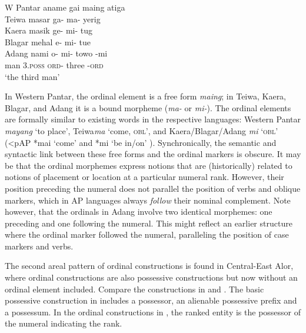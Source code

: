 \ea
\label{bkm:Ref342649632}
\gllllll
      {W Pantar}     aname  gai  maing  atiga \\  
      Teiwa          masar  ga-  ma-  yerig \\
      Kaera          masik  ge-  mi-  tug \\
      Blagar         mehal {\textglotstop}e-  mi-  tue  \\
      Adang          nami  o-  mi-  towo  {}-mi \\      
      { }            man \textsc{3.poss}  \textsc{ord-} three  -\textsc{ord} \\
\glt  `the third man'
\z

\let\eachwordone=\it
\let\eachwordtwo=\rm
\let\eachwordthree=\rm
\let\eachwordfour=\rm
\let\eachwordfive=\rm 

In Western Pantar, the ordinal element is a free form \textit{maing}; in Teiwa, Kaera, Blagar, and Adang it is a bound morpheme (\textit{ma-} or \textit{mi-}). The ordinal elements are formally similar to existing words in the respective languages: Western Pantar \textit{mayang} `to place', Teiwa\textit{ma} `come, \textsc{obl}', and Kaera/Blagar/Adang \textit{mi} `\textsc{obl' (}{\textless}pAP *mai `come' and *mi `be in/on' \citealt{HoltonRobinsonTVhistory}). Synchronically, the semantic and syntactic link between these free forms and the ordinal markers is obscure. It may be that the ordinal morphemes express notions that are (historically) related to notions of placement or location at a particular numeral rank. However, their position preceding the numeral does not parallel the position of verbs and oblique markers, which in AP languages always \textit{follow} their nominal complement. Note however, that the ordinals in Adang involve two identical morphemes: one preceding and one following the numeral. This might reflect an earlier structure where the ordinal marker followed the numeral, paralleling the position of case markers and verbs.

The second areal pattern of ordinal constructions is found in Central-East Alor, where ordinal constructions are also possessive constructions but now without an ordinal element included. Compare the constructions in  and . The basic possessive construction in  includes a possessor, an alienable possessive prefix and a possessum. In the ordinal constructions in , the ranked entity is the possessor of the numeral indicating the rank.


